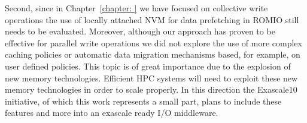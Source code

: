 Second, since in Chapter~\ref{chapter: } we have focused on collective write operations the use of locally attached NVM for data prefetching in ROMIO still needs to be evaluated. Moreover, although our approach has proven to be effective for parallel write operations we did not explore the use of more complex caching policies or automatic data migration mechanisms based, for example, on user defined policies. This topic is of great importance due to the explosion of new memory technologies. Efficient HPC systems will need to exploit these new memory technologies in order to scale properly. In this direction the Exascale10 initiative, of which this work represents a small part, plans to include these features and more into an exascale ready I/O middleware.

